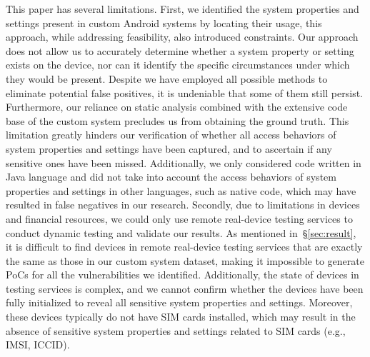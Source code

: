 This paper has several limitations. 
First, we identified the system properties and settings present in custom Android systems by locating their usage, this approach, while addressing feasibility, also introduced constraints. 
Our approach does not allow us to accurately determine whether a system property or setting exists on the device, nor can it identify the specific circumstances under which they would be present.
Despite we have employed all possible methods to eliminate potential false positives, it is undeniable that some of them still persist.
Furthermore, our reliance on static analysis combined with the extensive code base of the custom system precludes us from obtaining the ground truth. 
This limitation greatly hinders our verification of whether all access behaviors of system properties and settings have been captured, and to ascertain if any sensitive ones have been missed.
Additionally, we only considered code written in Java language and did not take into account the access behaviors of system properties and settings in other languages, such as native code, which may have resulted in false negatives in our research.
Secondly, due to limitations in devices and financial resources, we could only use remote real-device testing services to conduct dynamic testing and validate our results. 
As mentioned in~\S\ref{sec:result}, it is difficult to find devices in remote real-device testing services that are exactly the same as those in our custom system dataset, making it impossible to generate PoCs for all the vulnerabilities we identified.
Additionally, the state of devices in testing services is complex, and we cannot confirm whether the devices have been fully initialized to reveal all sensitive system properties and settings. 
Moreover, these devices typically do not have SIM cards installed, which may result in the absence of sensitive system properties and settings related to SIM cards (e.g., IMSI, ICCID).